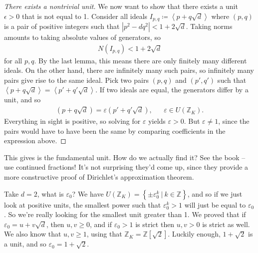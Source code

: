 \begin{proof}[There exists a nontrivial unit]

We now want to show that there exists a unit \(\epsilon>0\) that is not
equal to 1. Consider all ideals
\(I_{p, q} \coloneqq\left\langle{ p + q \sqrt{d} }\right\rangle\) where
\((p, q)\) is a pair of positive integers such that
\({\left\lvert {p^2 - dq^2} \right\rvert} < 1 + 2 \sqrt{d}\). Taking
norms amounts to taking absolute values of generators, so
\begin{align*}
N(I_{p, q} ) < 1 + 2 \sqrt{d}
\end{align*}
for all \(p, q\). By the last lemma, this means there are only finitely
many different ideals. On the other hand, there are infinitely many such
pairs, so infinitely many pairs give rise to the same ideal. Pick two
pairs \((p, q)\) and \((p', q')\) such that
\(\left\langle{ p + q \sqrt{d} }\right\rangle = \left\langle{ p' + q' \sqrt{d} }\right\rangle\).
If two ideals are equal, the generators differ by a unit, and so
\begin{align*}
(p + q \sqrt{d} ) = \varepsilon(p' + q' \sqrt{d} ), && \varepsilon\in U({\mathbb{Z}}_K)
.\end{align*}
Everything in sight is positive, so solving for \(\varepsilon\) yields
\(\varepsilon> 0\). But \(\varepsilon\neq 1\), since the pairs would
have to have been the same by comparing coefficients in the expression
above.

\end{proof}

\begin{remark}

This gives is the fundamental unit. How do we actually find it? See the
book -- use continued fractions! It's not surprising they'd come up,
since they provide a more constructive proof of Dirichlet's
approximation theorem.

\end{remark}

\begin{example}[?]

Take \(d=2\), what is \(\varepsilon_0\)? We have
\(U({\mathbb{Z}}_K) = \left\{{ \pm \varepsilon_0 ^k {~\mathrel{\Big|}~}k\in {\mathbb{Z}}}\right\}\),
and so if we just look at positive units, the smallest power such that
\(\varepsilon_0^k > 1\) will just be equal to \(\varepsilon_0\). So
we're really looking for the smallest unit greater than 1. We proved
that if \(\varepsilon_0 = u + v \sqrt{d}\), then \(u, v \geq 0\), and if
\(\varepsilon_0 > 1\) is strict then \(u, v > 0\) is strict as well. We
also know that \(u, v \geq 1\), using that
\({\mathbb{Z}}_K = {\mathbb{Z}}[\sqrt{2} ]\). Luckily enough,
\(1 + \sqrt{2}\) is a unit, and so \(\varepsilon_0 = 1 + \sqrt{2}\).

\end{example}


